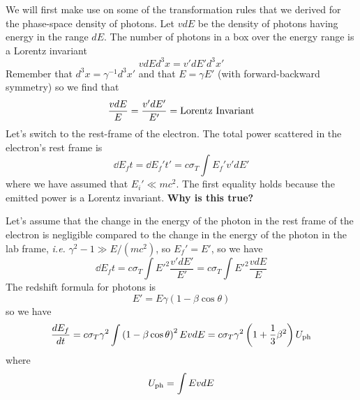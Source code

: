 We will first make use on some of the transformation rules that we
derived for the phase-space density of photons.  Let $v dE$ be the
density of photons having energy in the range $dE$.  The number of
photons in a box over the energy range is a Lorentz invariant
\begin{equation}
v dE d^3 x = v' dE' d^3 x'
\label{eq:409}
\end{equation}
Remember that $d^3 x = \gamma^{-1} d^3 x'$ and that $E = \gamma E'$ (with
forward-backward symmetry) so we
find that
\begin{equation}
\frac{v dE}{E} = \frac{v' dE'}{E'} = \hbox{\rm Lorentz Invariant}
\label{eq:410}
\end{equation}
Let's switch to the rest-frame of the electron.   The total power
scattered in the electron's rest frame is
\begin{equation}
\dd{E_f}{t} = \dd{E_f'}{t'} = c \sigma_T \int E_f' v' d E'
\label{eq:411}
\end{equation}
where we have assumed that $E_i' \ll m c^2$.  The first equality holds
because the emitted power is a Lorentz invariant. {\bf Why is this true?}

Let's assume that the change in the energy of the photon in the
rest frame of the electron is negligible compared to the change in the
energy of the photon in the lab frame, {\em i.e.} $\gamma^2 - 1 \gg
E/(m c^2)$, so $E_f'=E'$, so we have
\begin{equation}
\dd{E_f}{t} = c \sigma_T \int E'^2 \frac{v' dE'}{E'} = c
\sigma_T \int E'^2 \frac{v dE}{E}
\label{eq:412}
\end{equation}
The redshift formula for photons is 
\begin{equation}
E' = E \gamma \left ( 1 - \beta \cos\theta \right )
\label{eq:413}
\end{equation}
so we have
\begin{equation}
\frac{d {E_f}}{d {t}} = c \sigma_T \gamma^2 \int \left ( 1  - \beta
\cos\theta \right )^2 E v dE = c \sigma_T \gamma^2 \left ( 1 + \frac{1}{3}
\beta^2 \right ) U_{\hbox{\rm \scriptsize ph}}
\label{eq:414}
\end{equation}
where
\begin{equation}
U_{\hbox{\rm \scriptsize ph}} = \int E v dE
\label{eq:415}
\end{equation}

